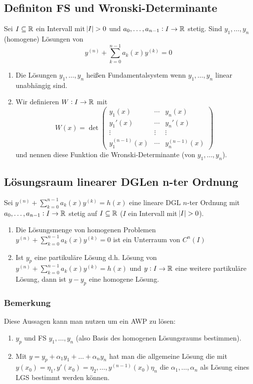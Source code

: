 \subsection{Definiton FS und Wronski-Determinante}
Sei $I  \subseteq \mathbb{R}$ ein Intervall mit $\abs{I} > 0$ und $a_0, \ldots, a_{n-1}: I \to \mathbb{R}$ stetig. Sind $y_1, \ldots, y_n$
(homogene) Lösungen von
\begin{equation*}
	y^{(n)} + \sum_{k=0}^{n-1} a_k(x) y^{(k)} = 0
\end{equation*}
\begin{enumerate}[label= (\alph*)]
	\item Die Lösungen $y_1, \ldots, y_n$ heißen Fundamentalsystem wenn $y_1, \ldots, y_n$ linear unabhängig sind.
	\item Wir definieren $W: I \to \mathbb{R}$ mit
		\begin{equation*}
			W(x) = \det \begin{pmatrix}
				y_1(x) & \cdots & y_n(x) \\
				y_1'(x) & \cdots & y_n'(x) \\
				\vdots & \vdots & \vdots \\
				y_1^{(n-1)}(x) & \cdots & y_n^{(n-1)}(x)
			\end{pmatrix}
		\end{equation*}
		und nennen diese Funktion die Wronski-Determinante (von $y_1, \ldots, y_n$).
\end{enumerate}

\subsection{Lösungsraum linearer DGLen n-ter Ordnung}
Sei $y^{(n)} + \sum_{k=0}^{n-1} a_k(x) y^{(k)} = h(x)$ eine lineare DGL $n$-ter Ordnung mit $a_0, \ldots, a_{n-1}: I \to \mathbb{R}$ stetig auf
$I \subseteq \mathbb{R}$ ($I$ ein Intervall mit $\abs{I}>0$).
\begin{enumerate}[label= (\alph*)]
	\item Die Lösungsmenge von homogenen Problemen $y^{(n)} + \sum_{k=0}^{n-1} a_k(x) y^{(k)} = 0$ ist ein Unterraum von $C^n(I)$
	\item Ist $y_p$ eine partikuläre Lösung d.h. Lösung von $y^{(n)} + \sum_{k=0}^{n-1} a_k(x) y^{(k)} = h(x)$ und $y: I \to \mathbb{R}$ eine
		weitere partikuläre Lösung, dann ist $y-y_p$ eine homogene Lösung.
\end{enumerate}

\subsubsection{Bemerkung}
Diese Aussagen kann man nutzen um ein AWP zu lösen:
\begin{enumerate}
	\item $y_p$ und FS $y_1, \ldots, y_n$ (also Basis des homogenen Lösungsraums bestimmen).
	\item Mit $y = y_p + \alpha_1 y_1 + \ldots + \alpha_n y_n$ hat man die allgemeine Lösung die mit
		$y(x_0) = \eta_1, y'(x_0) = \eta_2, \ldots, y^{(n-1)}(x_0) \eta_n$ die $\alpha_1, \ldots, \alpha_n$ als Lösung eines LGS bestimmt
		werden können. 
\end{enumerate}

